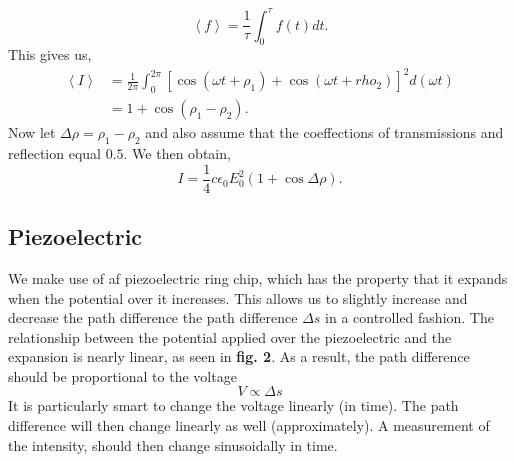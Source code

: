 \documentclass[working, oneside]{inputs/tuftebook}
\begin{document}
\[
\left<f \right> = \frac{1}{\tau} \int_{0}^{\tau}f\left( t \right) dt  
.\]
This gives us,
\begin{align*}
\left<I \right> &=  \frac{1}{2\pi} \int_{0}^{2\pi} \left[ \cos\left( \omega t + \rho_1 \right) + \cos\left( \omega t + rho_2 \right)   \right] ^2 d \left( \omega t \right)  \\
&=  1+ \cos\left( \rho _1 - \rho_2  \right)  
.\end{align*}
Now let $ \Delta \rho = \rho_1 - \rho_2$ and also assume that the coeffections of transmissions and reflection equal $0.5$. We then obtain,
 \[
I = \frac{1}{4}c\epsilon_0 E_0^2 \left( 1 + \cos \Delta \rho  \right) 
.\]
\subsection*{Piezoelectric}
We make use of af piezoelectric ring chip, which has the property that it expands when the potential over it increases. This allows us to slightly increase and decrease the path difference the path difference $\Delta s$ in a controlled fashion. The relationship between the potential applied over the piezoelectric and the expansion is nearly linear, as seen in \textbf{fig. 2}. As a result, the path difference should be proportional to the voltage
\[
V \propto \Delta s
\]
It is particularly smart to change the voltage linearly (in time). The path difference will then change linearly as well (approximately). A measurement of the intensity, should then change sinusoidally in time.
\end{document}
